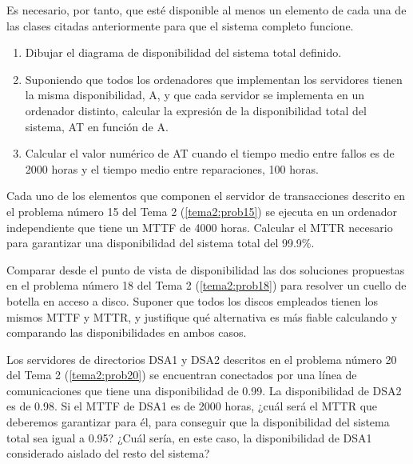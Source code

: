   Es necesario, por tanto, que esté disponible al menos un elemento
de cada una de las clases citadas anteriormente para que el sistema
completo funcione.
  \begin{enumerate}
    	\item Dibujar el diagrama de disponibilidad del sistema total definido.
    	\item Suponiendo que todos los ordenadores que implementan los
servidores tienen la misma disponibilidad, A, y que cada servidor se
implementa en un ordenador distinto, calcular la expresión de la
disponibilidad total del sistema, AT en función de A.
    	\item Calcular el valor numérico de AT cuando el tiempo medio entre
fallos es de 2000 horas y el tiempo medio entre reparaciones, 100 horas.
  \end{enumerate}

\TheSolution



\Problem[8]
Cada uno de los elementos que componen el servidor de transacciones descrito en el problema número 15 del Tema 2 (\ref{tema2:prob15}) se ejecuta en un ordenador independiente que tiene un MTTF de 4000
horas. Calcular el MTTR necesario para garantizar una disponibilidad del sistema total del 99.9\%.

\TheSolution



\Problem[9]
Comparar desde el punto de vista de disponibilidad las dos soluciones propuestas en el problema número 18 del Tema 2 (\ref{tema2:prob18})
 para resolver un cuello de botella en acceso a disco. Suponer que todos
 los discos empleados tienen los mismos MTTF y MTTR, y justifique qué
alternativa es más fiable calculando y comparando las disponibilidades
en ambos casos.

\TheSolution


\Problem[10]
Los servidores de directorios DSA1 y DSA2 descritos en el problema número 20 del Tema 2 (\ref{tema2:prob20})
 se encuentran conectados por una línea de comunicaciones que tiene una
disponibilidad de 0.99. La disponibilidad de DSA2 es de 0.98. Si el MTTF
 de DSA1 es de 2000 horas, ¿cuál será el MTTR que deberemos garantizar
para él, para conseguir que la disponibilidad del sistema total sea
igual a 0.95? ¿Cuál sería, en este caso, la disponibilidad de DSA1
considerado aislado del resto del sistema?

